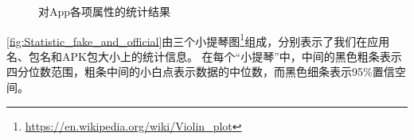 \begin{figure}[htbp]
	\centering
    \hfill
    \hfill
    \hfill
	\caption{对App各项属性的统计结果}
	\label{fig:Statistic_fake_and_official}
	\vspace{-5mm}
\end{figure}

\autoref{fig:Statistic_fake_and_official}由三个小提琴图\footnote{\url{https://en.wikipedia.org/wiki/Violin_plot}}组成，分别表示了我们在应用名、包名和APK包大小上的统计信息。
在每个``小提琴''中，中间的黑色粗条表示四分位数范围，粗条中间的小白点表示数据的中位数，而黑色细条表示95\%置信空间。

